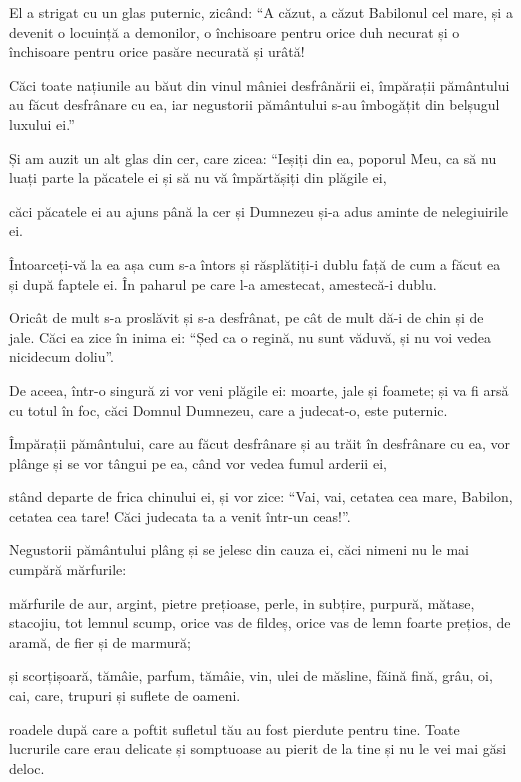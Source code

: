 {El a strigat cu un glas puternic, zicând: “A căzut, a căzut Babilonul cel mare, și a devenit o locuință a demonilor, o închisoare pentru orice duh necurat și o închisoare pentru orice pasăre necurată și urâtă!

Căci toate națiunile au băut din vinul mâniei desfrânării ei, împărații pământului au făcut desfrânare cu ea, iar negustorii pământului s-au îmbogățit din belșugul luxului ei.”


\par }{\PP {}Și am auzit un alt glas din cer, care zicea: “Ieșiți din ea, poporul Meu, ca să nu luați parte la păcatele ei și să nu vă împărtășiți din plăgile ei,

căci păcatele ei au ajuns până la cer și Dumnezeu și-a adus aminte de nelegiuirile ei.

Întoarceți-vă la ea așa cum s-a întors și răsplătiți-i dublu față de cum a făcut ea și după faptele ei. În paharul pe care l-a amestecat, amestecă-i dublu.

Oricât de mult s-a proslăvit și s-a desfrânat, pe cât de mult dă-i de chin și de jale. Căci ea zice în inima ei: “Șed ca o regină, nu sunt văduvă, și nu voi vedea nicidecum doliu”.

De aceea, într-o singură zi vor veni plăgile ei: moarte, jale și foamete; și va fi arsă cu totul în foc, căci Domnul Dumnezeu, care a judecat-o, este puternic.


\par }{\PP {}Împărații pământului, care au făcut desfrânare și au trăit în desfrânare cu ea, vor plânge și se vor tângui pe ea, când vor vedea fumul arderii ei,

stând departe de frica chinului ei, și vor zice: “Vai, vai, cetatea cea mare, Babilon, cetatea cea tare! Căci judecata ta a venit într-un ceas!”.

Negustorii pământului plâng și se jelesc din cauza ei, căci nimeni nu le mai cumpără mărfurile:

mărfurile de aur, argint, pietre prețioase, perle, in subțire, purpură, mătase, stacojiu, tot lemnul scump, orice vas de fildeș, orice vas de lemn foarte prețios, de aramă, de fier și de marmură;

și scorțișoară, tămâie, parfum, tămâie, vin, ulei de măsline, făină fină, grâu, oi, cai, care, trupuri și suflete de oameni.

roadele după care a poftit sufletul tău au fost pierdute pentru tine. Toate lucrurile care erau delicate și somptuoase au pierit de la tine și nu le vei mai găsi deloc.

}
